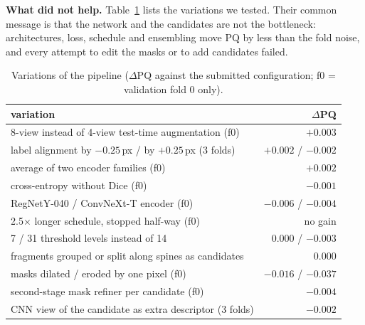 \documentclass[sigconf]{acmart}
\begin{document}
    \textbf{What did not help.} Table~\ref{tab:ablation} lists the variations we tested. Their common message is that the network and the candidates are not the bottleneck: architectures, loss, schedule and ensembling move PQ by less than the fold noise, and every attempt to edit the masks or to add candidates failed.

\begin{table}[t]
    \caption{Variations of the pipeline ($\Delta$PQ against the submitted configuration; f0 = validation fold 0 only).}
    \label{tab:ablation}
    \small
    \begin{tabular}{@{}lr@{}}
        \toprule
        variation & $\Delta$PQ \\
        \midrule
        8-view instead of 4-view test-time augmentation (f0) & $+0.003$ \\
        label alignment by $-0.25$\,px / by $+0.25$\,px (3 folds) & $+0.002$ / $-0.002$ \\
        average of two encoder families (f0) & $+0.002$ \\
        cross-entropy without Dice (f0) & $-0.001$ \\
        RegNetY-040 / ConvNeXt-T encoder (f0) & $-0.006$ / $-0.004$ \\
        2.5$\times$ longer schedule, stopped half-way (f0) & no gain \\
        7 / 31 threshold levels instead of 14 & $0.000$ / $-0.003$ \\
        fragments grouped or split along spines as candidates & $0.000$ \\
        masks dilated / eroded by one pixel (f0) & $-0.016$ / $-0.037$ \\
        second-stage mask refiner per candidate (f0) & $-0.004$ \\
        CNN view of the candidate as extra descriptor (3 folds) & $-0.002$ \\
        \bottomrule
    \end{tabular}
\end{table}
\end{document}
